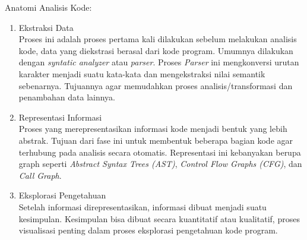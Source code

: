Anatomi Analisis Kode:
\begin{enumerate}[leftmargin=1.3cm]
	\item Ekstraksi Data\\
	Proses ini adalah proses pertama kali dilakukan sebelum melakukan analisis kode, data yang diekstrasi berasal dari kode program. Umumnya dilakukan dengan \textit{syntatic analyzer} atau \textit{parser}. Proses \textit{Parser} ini mengkonversi urutan karakter menjadi suatu kata-kata dan mengekstraksi nilai semantik sebenarnya. Tujuannya agar memudahkan proses analisis/transformasi dan penambahan data lainnya.
	\item Representasi Informasi\\
	Proses yang merepresentasikan informasi kode menjadi bentuk yang lebih abstrak. Tujuan dari fase ini untuk membentuk beberapa bagian kode agar terhubung pada analisis secara otomatis. Representasi ini kebanyakan berupa graph seperti \textit{Abstract Syntax Trees (AST)}, \textit{Control Flow Graphs (CFG)}, dan \textit{Call Graph}.
	\item Eksplorasi Pengetahuan\\
	Setelah informasi direpresentasikan, informasi dibuat menjadi suatu kesimpulan. Kesimpulan bisa dibuat secara kuantitatif atau kualitatif, proses visualisasi penting dalam proses eksplorasi pengetahuan kode program.
\end{enumerate}

